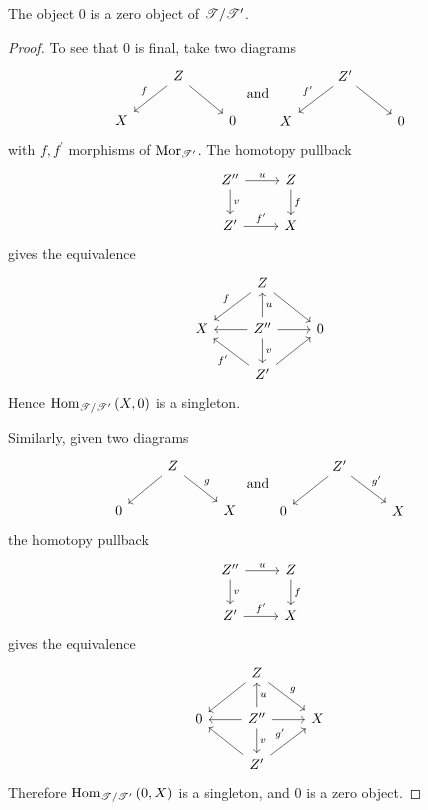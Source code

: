\documentclass[dissertation.tex]{subfiles}
\begin{document}
\begin{lem}\label{verdierzero}
  The object $0$ is a zero object of $\mathscr{T}/\mathscr{T}^\prime$.
  
  \begin{proof}
    To see that $0$ is final, take two diagrams
    $$\begin{tikzcd}
      & Z \arrow[swap]{ld}{f}\arrow{rd}\\
      X & & 0
    \end{tikzcd}\ \text{and}\ 
    \begin{tikzcd}
      & Z^\prime \arrow[swap]{ld}{f^\prime}\arrow{rd}\\
      X & & 0
    \end{tikzcd}$$
    with $f,f^\prime$ morphisms of $\operatorname{Mor}_{\mathscr{T}^\prime}$.
    The homotopy pullback
    $$\begin{tikzcd}
      Z^{\prime\prime}\arrow{r}{u}\arrow{d}{v} & Z\arrow{d}{f}\\
      Z^\prime \arrow{r}{f^\prime} & X
    \end{tikzcd}$$
    gives the equivalence
    $$\begin{tikzcd}
      & Z\arrow[swap]{ld}{f}\arrow{rd}\\
      X & Z^{\prime\prime}\arrow{l}\arrow{r}\arrow[swap]{u}{u}\arrow{d}{v} & 0\\
      & Z^\prime \arrow{ul}{f^\prime}\arrow{ur}
    \end{tikzcd}$$
    Hence $\operatorname{Hom}_{\mathscr{T}/\mathscr{T}^\prime}\left(X,0\right)$ is a singleton.
    
    Similarly, given two diagrams
    $$\begin{tikzcd}
      & Z \arrow{rd}{g}\arrow{ld}\\
      0 & & X
    \end{tikzcd}\ \text{and}\ 
    \begin{tikzcd}
      & Z^\prime \arrow{rd}{g^\prime}\arrow{ld}\\
      0 & & X
    \end{tikzcd}$$
    the homotopy pullback
    $$\begin{tikzcd}
      Z^{\prime\prime}\arrow{r}{u}\arrow{d}{v} & Z\arrow{d}{f}\\
      Z^\prime \arrow{r}{f^\prime} & X
    \end{tikzcd}$$
    gives the equivalence
    $$\begin{tikzcd}
      & Z\arrow{ld}\arrow{rd}{g}\\
      0 & Z^{\prime\prime}\arrow{l}\arrow{r}\arrow[swap]{u}{u}\arrow{d}{v} & X\\
      & Z^\prime \arrow{ul}\arrow{ur}{g^\prime}
    \end{tikzcd}$$
    Therefore $\operatorname{Hom}_{\mathscr{T}/\mathscr{T}^\prime}\left(0,X\right)$ is a singleton, and $0$ is a zero object.
  \end{proof}
\end{lem}
\end{document}

